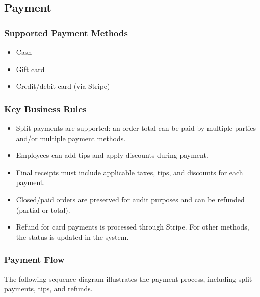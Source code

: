 \documentclass[]{VUMIFTemplateClass}
\begin{document}


\subsection{Payment}

\subsubsection{Supported Payment Methods}
\begin{itemize}
\item Cash
\item Gift card
\item Credit/debit card (via Stripe)
\end{itemize}

\subsubsection{Key Business Rules}
\begin{itemize}
\item Split payments are supported: an order total can be paid by multiple parties and/or multiple payment methods.
\item Employees can add tips and apply discounts during payment.
\item Final receipts must include applicable taxes, tips, and discounts for each payment.
\item Closed/paid orders are preserved for audit purposes and can be refunded (partial or total).
\item Refund for card payments is processed through Stripe. For other methods, the status is updated in the system.
\end{itemize}

\subsubsection{Payment Flow}
The following sequence diagram illustrates the payment process, including split payments, tips, and refunds.
\end{document}
